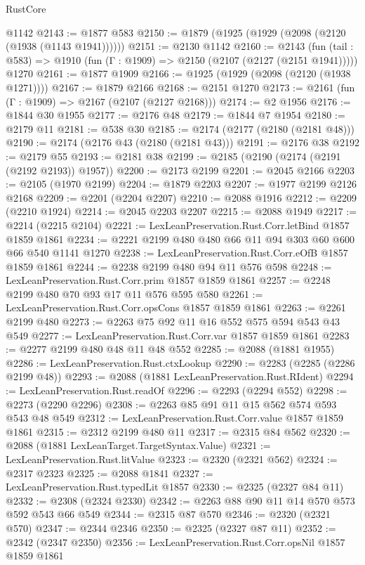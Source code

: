 \begin{lexlean}{RustCore}
\begin{coremodule}
    @1142
@2143 := @1877 @583
@2150 := @1879 (@1925 (@1929 (@2098 (@2120 (@1938 (@1143 @1941))))))
@2151 := @2130 @1142
@2160 := @2143
    (fun (tail : @583) => @1910 (fun (Γ : @1909) => @2150 (@2107 (@2127 (@2151 @1941)))))
    @1270
@2161 := @1877 @1909
@2166 := @1925 (@1929 (@2098 (@2120 (@1938 @1271))))
@2167 := @1879 @2166
@2168 := @2151 @1270
@2173 := @2161 (fun (Γ : @1909) => @2167 (@2107 (@2127 @2168)))
@2174 := @2 @1956
@2176 := @1844 @30 @1955
@2177 := @2176 @48
@2179 := @1844 @7 @1954
@2180 := @2179 @11
@2181 := @538 @30
@2185 := @2174 (@2177 (@2180 (@2181 @48)))
@2190 := @2174 (@2176 @43 (@2180 (@2181 @43)))
@2191 := @2176 @38
@2192 := @2179 @55
@2193 := @2181 @38
@2199 := @2185 (@2190 (@2174 (@2191 (@2192 @2193)) @1957))
@2200 := @2173 @2199
@2201 := @2045 @2166
@2203 := @2105 (@1970 @2199)
@2204 := @1879 @2203
@2207 := @1977 @2199 @2126 @2168
@2209 := @2201 (@2204 @2207)
@2210 := @2088 @1916
@2212 := @2209 (@2210 @1924)
@2214 := @2045 @2203 @2207
@2215 := @2088 @1949
@2217 := @2214 (@2215 @2104)
@2221 := LexLeanPreservation.Rust.Corr.letBind @1857 @1859 @1861
@2234 := @2221 @2199 @480 @480 @66 @11 @94 @303 @60 @600 @66 @540 @1141 @1270
@2238 := LexLeanPreservation.Rust.Corr.eOfB @1857 @1859 @1861
@2244 := @2238 @2199 @480 @94 @11 @576 @598
@2248 := LexLeanPreservation.Rust.Corr.prim @1857 @1859 @1861
@2257 := @2248 @2199 @480 @70 @93 @17 @11 @576 @595 @580
@2261 := LexLeanPreservation.Rust.Corr.opsCons @1857 @1859 @1861
@2263 := @2261 @2199 @480
@2273 := @2263 @75 @92 @11 @16 @552 @575 @594 @543 @43 @549
@2277 := LexLeanPreservation.Rust.Corr.var @1857 @1859 @1861
@2283 := @2277 @2199 @480 @48 @11 @48 @552
@2285 := @2088 (@1881 @1955)
@2286 := LexLeanPreservation.Rust.ctxLookup
@2290 := @2283 (@2285 (@2286 @2199 @48))
@2293 := @2088 (@1881 LexLeanPreservation.Rust.RIdent)
@2294 := LexLeanPreservation.Rust.readOf
@2296 := @2293 (@2294 @552)
@2298 := @2273 (@2290 @2296)
@2308 := @2263 @85 @91 @11 @15 @562 @574 @593 @543 @48 @549
@2312 := LexLeanPreservation.Rust.Corr.value @1857 @1859 @1861
@2315 := @2312 @2199 @480 @11
@2317 := @2315 @84 @562
@2320 := @2088 (@1881 LexLeanTarget.TargetSyntax.Value)
@2321 := LexLeanPreservation.Rust.litValue
@2323 := @2320 (@2321 @562)
@2324 := @2317 @2323
@2325 := @2088 @1841
@2327 := LexLeanPreservation.Rust.typedLit @1857
@2330 := @2325 (@2327 @84 @11)
@2332 := @2308 (@2324 @2330)
@2342 := @2263 @88 @90 @11 @14 @570 @573 @592 @543 @66 @549
@2344 := @2315 @87 @570
@2346 := @2320 (@2321 @570)
@2347 := @2344 @2346
@2350 := @2325 (@2327 @87 @11)
@2352 := @2342 (@2347 @2350)
@2356 := LexLeanPreservation.Rust.Corr.opsNil @1857 @1859 @1861

\end{coremodule}
\end{lexlean}

